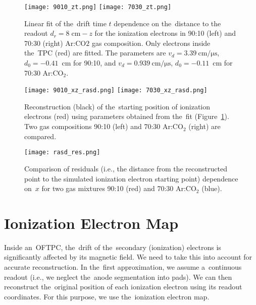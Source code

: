 		\begin{figure}
			\centering
			\texttt{[image: 9010\_zt.png]}
			\hfill
			\texttt{[image: 7030\_zt.png]}
			\caption{Linear fit of the~drift time $t$ dependence on the~distance to the readout $d_r = 8\;\text{cm} - z$ for the ionization electrons in 90:10 (left) and 70:30 (right) Ar:CO$2$ gas composition. Only electrons inside the~\ac{TPC} (red) are fitted. The parameters are $v_d = \SI{3.39}{\centi\meter\per\micro\second}$, $d_0 = -0.41$~cm for 90:10, and $v_d = \SI{0.939}{\centi\meter\per\micro\second}$, $d_0 = -0.11$~cm for 70:30 Ar:CO$_2$.}
			\label{fig:zt}
		\end{figure}
		
		\begin{figure}
			\centering
			\texttt{[image: 9010\_xz\_rasd.png]}
			\hfill
			\texttt{[image: 7030\_xz\_rasd.png]}
			\caption{Reconstruction (black) of the~starting position of ionization electrons (red) using parameters obtained from the~fit (Figure~\ref{fig:zt}). Two gas compositions 90:10 (left) and 70:30 Ar:CO$_2$ (right) are compared.}
			\label{fig:rasd_xz}
		\end{figure}
		
		\begin{figure}
			\centering
			\texttt{[image: rasd\_res.png]}
			\caption{Comparison of residuals (i.e., the distance from the reconstructed point to the simulated ionization electron starting point) dependence on~$x$ for two gas mixtures 90:10 (red) and 70:30 Ar:CO$_2$ (blue).}
			\label{fig:rasd_res}
		\end{figure}
	
	\section{Ionization Electron Map}
	\label{sec:map}
		Inside an~\ac{OFTPC}, the~drift of the~secondary (ionization) electrons is significantly affected by its magnetic field. We need to take this into account for accurate reconstruction. In the~first approximation, we assume a~continuous readout (i.e., we neglect the~anode segmentation into pads). We can then reconstruct the~original position of each ionization electron using its readout coordinates. For this purpose, we use the~ionization electron map.
		
